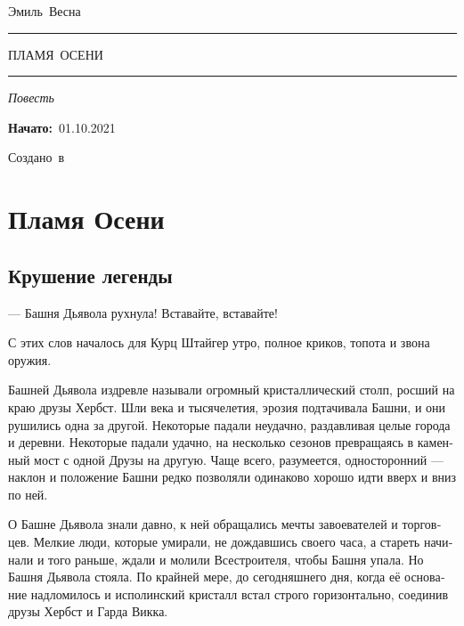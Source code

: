 \documentclass[a4paper,10pt,fleqn]{book}\usepackage{polyglossia}\setdefaultlanguage[babelshorthands=true]{russian}\setotherlanguage{english}\defaultfontfeatures{Ligatures=TeX,Mapping=tex-text}\usepackage{xcolor}\newcommand{\ml}[3]{#2}
\newcommand{\tofaauthor}{\ml{$0$}{Эмиль~Весна}{Emil~Viesn\'{a}}}
\newcommand{\tofatitle}{\ml{$0$}{ПЛАМЯ~ОСЕНИ}{Flame~of~the~Fall}}
\newcommand{\tofastarted}{01.10.2021}
\newcommand{\asterism}{\vspace{1em}{\centering\Large\bfseries$\ast~\ast~\ast$\par}\vspace{1em}}
\begin{document}

\begin{titlepage}
{\centering{~\par}\vspace{0.25\textheight}
{\LARGE\tofaauthor}\par
\vspace{1.0cm}\rule{17em}{1pt}\par\vspace{0.3cm}
{\Huge\textsc{\tofatitle}\par}
\vspace{0.3cm}\rule{17em}{2pt}\par\vspace{1.0cm}
{\Large\textit{\ml{$0$}{Повесть}{Novella}}\par}
\vspace{0.5cm}\asterism\par\vspace{1.0cm}
{\textbf{\ml{$0$}{Начато:}{Started:}}~\tofastarted\par}\vfill
{\Large\ml{$0$}{Создано~в}{Created~by}~\XeLaTeX}\par}
\end{titlepage}

\tableofcontents

\chapter{Пламя Осени}

\section{Крушение легенды}

--- Башня Дьявола рухнула!
Вставайте, вставайте!

С этих слов началось для Курц Штайгер утро, полное криков, топота и звона оружия.

Башней Дьявола издревле называли огромный кристаллический столп, росший на краю друзы Хербст.
Шли века и тысячелетия, эрозия подтачивала Башни, и они рушились одна за другой.
Некоторые падали неудачно, раздавливая целые города и деревни.
Некоторые падали удачно, на несколько сезонов превращаясь в каменный мост с одной Друзы на другую.
Чаще всего, разумеется, односторонний --- наклон и положение Башни редко позволяли одинаково хорошо идти вверх и вниз по ней.

О Башне Дьявола знали давно, к ней обращались мечты завоевателей и торговцев.
Мелкие люди, которые умирали, не дождавшись своего часа, а стареть начинали и того раньше, ждали и молили Всестроителя, чтобы Башня упала.
Но Башня Дьявола стояла.
По крайней мере, до сегодняшнего дня, когда её основание надломилось и исполинский кристалл встал строго горизонтально, соединив друзы Хербст и Гарда Викка.
\end{document}
